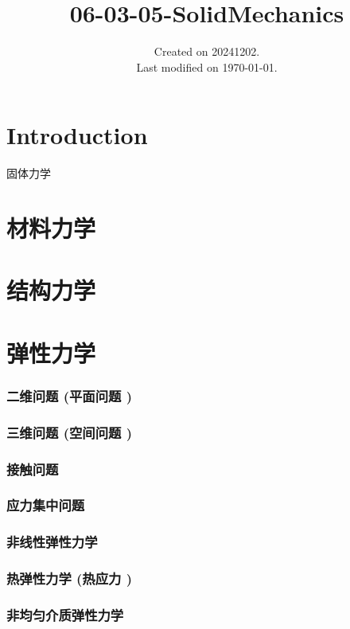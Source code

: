 \documentclass[UTF8]{../../06-Physics}
\begin{document}
\title{06-03-05-SolidMechanics}
\date{Created on 20241202.\\   Last modified on \today.}
\maketitle
\tableofcontents


\chapter{Introduction}

固体力学



\chapter{材料力学}
\chapter{结构力学}

\chapter{弹性力学}
    \subsection{二维问题 (平面问题 )}
    \subsection{三维问题 (空间问题 )}
    \subsection{接触问题}
    \subsection{应力集中问题}
    \subsection{非线性弹性力学}
    \subsection{热弹性力学 (热应力 )}
    \subsection{非均匀介质弹性力学}
\end{document}
